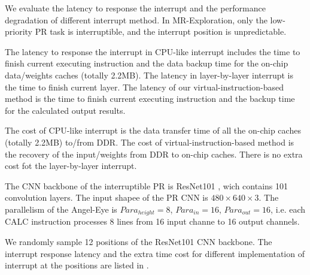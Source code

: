 We evaluate the latency to response the interrupt and the performance degradation of different interrupt method. In MR-Exploration, only the low-priority PR task is interruptible, and the interrupt position is unpredictable. 

The latency to response the interrupt in CPU-like interrupt includes the time to finish current executing instruction and the data backup time for the on-chip data/weights caches (totally 2.2MB). The latency in layer-by-layer interrupt is the time to finish current layer. The latency of our virtual-instruction-based method is the time to finish current executing instruction and the backup time for the calculated output results. 

The cost of CPU-like interrupt is the data transfer time of all the on-chip caches (totally 2.2MB) to/from DDR. The cost of virtual-instruction-based method is the recovery of the input/weights from DDR to on-chip caches. There is no extra cost fot the layer-by-layer interrupt.


The CNN backbone of the interruptible PR is ResNet101 \cite{he2016deep}, wich contains 101 convolution layers. The input shapee of the PR CNN is $480 \times 640 \times 3$. The parallelism of the Angel-Eye is $Para_{height}=8$, $Para_{in}=16$, $Para_{out}=16$, i.e. each CALC instruction processes 8 lines from 16 input channe to 16 output channels. 

We randomly sample 12 positions of the ResNet101 CNN backbone. The interrupt response latency and the extra time cost for different implementation of interrupt at the positions are listed in .




